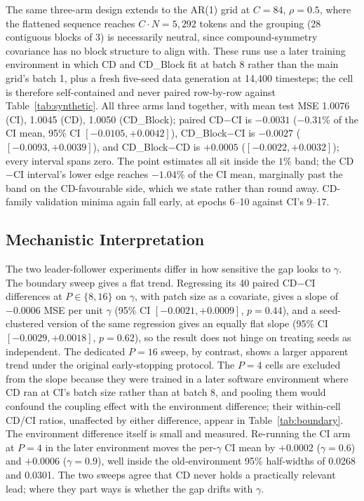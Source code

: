 \documentclass[10pt]{article} %
\begin{document}
    The same three-arm design extends to the AR(1) grid at $C = 84$, $\rho = 0.5$, where the flattened sequence reaches
    $C \cdot N = 5{,}292$ tokens and the grouping (28 contiguous blocks of 3) is necessarily neutral, since
    compound-symmetry covariance has no block structure to align with. These runs use a later training environment in
    which CD and CD\_Block fit at batch 8 rather than the main grid's batch 1, plus a fresh five-seed data generation at
    14{,}400 timesteps; the cell is therefore self-contained and never paired row-by-row against Table~\ref{tab:synthetic}.
    All three arms land together, with mean test MSE 1.0076 (CI), 1.0045 (CD), 1.0050 (CD\_Block); paired CD$-$CI is
    $-0.0031$ ($-0.31\%$ of the CI mean, 95\% CI $[-0.0105, +0.0042]$), CD\_Block$-$CI is $-0.0027$
    ($[-0.0093, +0.0039]$), and CD\_Block$-$CD is $+0.0005$ ($[-0.0022, +0.0032]$); every interval spans zero. The
    point estimates all sit inside the $1\%$ band; the CD$-$CI interval's lower edge reaches $-1.04\%$ of the CI mean,
    marginally past the band on the CD-favourable side, which we state rather than round away. CD-family validation
    minima again fall early, at epochs 6--10 against CI's 9--17.


    \subsection{Mechanistic Interpretation}
    \label{subsec:mechanistic}

    The two leader-follower experiments differ in how sensitive the gap looks to $\gamma$. The boundary sweep gives a
    flat trend. Regressing its 40 paired CD$-$CI differences at $P \in \{8, 16\}$ on $\gamma$, with patch size as a
    covariate, gives a slope of $-0.0006$ MSE per unit $\gamma$ (95\% CI $[-0.0021, +0.0009]$, $p = 0.44$), and a
    seed-clustered version of the same regression gives an equally flat slope (95\% CI $[-0.0029, +0.0018]$,
    $p = 0.62$), so the result does not hinge on treating seeds as independent. The dedicated $P = 16$ sweep, by
    contrast, shows a larger apparent trend under the original early-stopping protocol. The $P = 4$ cells are excluded
    from the slope because they were trained in a later software environment where CD ran at CI's batch size rather
    than at batch 8, and pooling them would confound the coupling effect with the environment difference; their
    within-cell CD/CI ratios, unaffected by either difference, appear in Table~\ref{tab:boundary}. The environment
    difference itself is small and measured. Re-running the CI arm at $P = 4$ in the later environment moves the
    per-$\gamma$ CI mean by $+0.0002$ ($\gamma = 0.6$) and $+0.0006$ ($\gamma = 0.9$), well inside the old-environment
    95\% half-widths of 0.0268 and 0.0301. The two sweeps agree that CD never holds a practically relevant lead; where
    they part ways is whether the gap drifts with $\gamma$.
\end{document}
